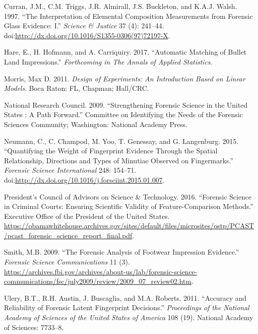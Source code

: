 \documentclass[]{book}
\theoremstyle{definition}
\theoremstyle{definition}
\theoremstyle{remark}
\begin{document}
\hypertarget{ref-curranetal}{}
Curran, J.M., C.M. Triggs, J.R. Almirall, J.S. Buckleton, and K.A.J.
Walsh. 1997. ``The Interpretation of Elemental Composition Measurements
from Forensic Glass Evidence: I.'' \emph{Science \& Justice} 37 (4):
241--44.
doi:\href{https://doi.org/http://dx.doi.org/10.1016/S1355-0306(97)72197-X}{http://dx.doi.org/10.1016/S1355-0306(97)72197-X}.

\hypertarget{ref-hare}{}
Hare, E., H. Hofmann, and A. Carriquiry. 2017. ``Automatic Matching of
Bullet Land Impressions.'' \emph{Forthcoming in The Annals of Applied
Statistics}.

\hypertarget{ref-doe}{}
Morris, Max D. 2011. \emph{Design of Experiments: An Introduction Based
on Linear Models}. Boca Raton: FL, Chapman; Hall/CRC.

\hypertarget{ref-nrc09}{}
National Research Council. 2009. ``Strengthening Forensic Science in the
United States : A Path Forward.'' Committee on Identifying the Needs of
the Forensic Sciences Community; Washington: National Academy Press.

\hypertarget{ref-neumann15}{}
Neumann, C., C. Champod, M. Yoo, T. Genessay, and G. Langenburg. 2015.
``Quantifying the Weight of Fingerprint Evidence Through the Spatial
Relationship, Directions and Types of Minutiae Observed on
Fingermarks.'' \emph{Forensic Science International} 248: 154--71.
doi:\href{https://doi.org/http://dx.doi.org/10.1016/j.forsciint.2015.01.007}{http://dx.doi.org/10.1016/j.forsciint.2015.01.007}.

\hypertarget{ref-pcast}{}
President's Council of Advisors on Science \& Technology. 2016.
``Forensic Science in Criminal Courts: Ensuring Scientific Validity of
Feature-Comparison Methods.'' Executive Office of the President of the
United States.
\url{https://obamawhitehouse.archives.gov/sites/default/files/microsites/ostp/PCAST/pcast_forensic_science_report_final.pdf}.

\hypertarget{ref-shoepic}{}
Smith, M.B. 2009. ``The Forensic Analysis of Footwear Impression
Evidence.'' \emph{Forensic Science Communications} 11 (3).
\url{https://archives.fbi.gov/archives/about-us/lab/forensic-science-communications/fsc/july2009/review/2009_07_review02.htm}.

\hypertarget{ref-uleryetal}{}
Ulery, B.T., R.H. Austin, J. Buscaglia, and M.A. Roberts. 2011.
``Accuracy and Reliability of Forensic Latent Fingerprint Decisions.''
\emph{Proceedings of the National Academy of Sciences of the United
States of America} 108 (19). National Academy of Sciences: 7733--8.
\end{document}
